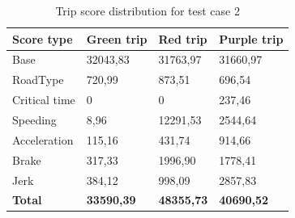 \begin{table}
    \centering
    \begin{tabular}{llll}
    \textbf{Score type} & \textbf{Green trip} & \textbf{Red trip} & \textbf{Purple trip}\\ \hline
    Base                & 32043,83            & 31763,97          & 31660,97            \\
    RoadType            & 720,99              & 873,51            & 696,54              \\
    Critical time       & 0                   & 0                 & 237,46              \\
    Speeding            & 8,96                & 12291,53          & 2544,64             \\
    Acceleration        & 115,16              & 431,74            & 914,66              \\
    Brake               & 317,33              & 1996,90           & 1778,41             \\
    Jerk                & 384,12              & 998,09            & 2857,83             \\ \hline
    \textbf{Total}      & \textbf{33590,39}   & \textbf{48355,73} & \textbf{40690,52}   \\ \hline
    \end{tabular}
    \caption{Trip score distribution for test case 2}
    \label{tab:longtripscores}
\end{table}

